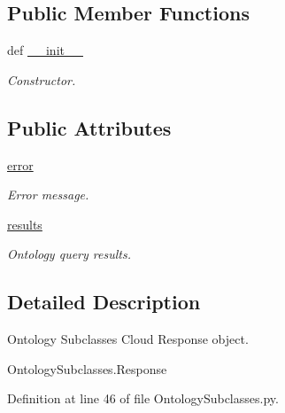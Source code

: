 \subsection*{Public Member Functions}
\begin{DoxyCompactItemize}
\item 
def \hyperlink{classRappCloud_1_1CloudMsgs_1_1OntologySubclasses_1_1OntologySubclasses_1_1Response_af2d8f839d8bcc8ea0eb03544d2a5adce}{\-\_\-\-\_\-init\-\_\-\-\_\-}
\begin{DoxyCompactList}\small\item\em Constructor. \end{DoxyCompactList}\end{DoxyCompactItemize}
\subsection*{Public Attributes}
\begin{DoxyCompactItemize}
\item 
\hyperlink{classRappCloud_1_1CloudMsgs_1_1OntologySubclasses_1_1OntologySubclasses_1_1Response_ad49d4961e2d60656e98bfa017946a918}{error}
\begin{DoxyCompactList}\small\item\em Error message. \end{DoxyCompactList}\item 
\hyperlink{classRappCloud_1_1CloudMsgs_1_1OntologySubclasses_1_1OntologySubclasses_1_1Response_a90df55871a3c1cbc4b7aa9d98e070910}{results}
\begin{DoxyCompactList}\small\item\em Ontology query results. \end{DoxyCompactList}\end{DoxyCompactItemize}


\subsection{Detailed Description}
\begin{DoxyVerb}Ontology Subclasses Cloud Response object.

OntologySubclasses.Response
\end{DoxyVerb}
 

Definition at line 46 of file Ontology\-Subclasses.\-py.



